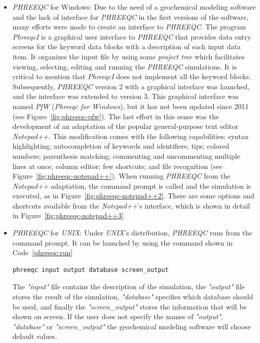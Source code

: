 \begin{itemize}
\item \emph{PHREEQC} for Windows: Due to the need of a geochemical modeling software and the lack of interface for \emph{PHREEQC} in the first versions of the software, many efforts were made to create an interface to \emph{PHREEQC}. The program \emph{PhreeqcI} is a graphical user interface to \emph{PHREEQC} that provides data entry screens for the keyword data blocks with a description of each input data item. It organizes the input file by using some \emph{project tree} which facilitates viewing, selecting, editing and running the \emph{PHREEQC} simulations. It is critical to mention that \emph{PhreeqcI} does not implement all the keyword blocks. Subsequently, \emph{PHREEQC} version 2 with a graphical interface was launched, and the interface was extended to version 3. This graphical interface was named \emph{PfW} (\emph{Phreeqc for Windows}), but it has not been updated since 2011 (see Figure~\ref{fig:phreeqc-pfw}). The last effort in this sense was the development of an adaptation of the popular general-purpose text editor \emph{Notepad++}. This modification comes with the following capabilities: syntax highlighting; autocompletion of keywords and identifiers; tips; colored numbers; parenthesis matching; commenting and uncommenting multiple lines at once; column editor; few shortcuts; and file recognition (see Figure~\ref{fig:phreeqc-notepad++}). When running \emph{PHREEQC} from the \emph{Notepad++} adaptation, the command prompt is called and the simulation is executed, as in Figure~\ref{fig:phreeqc-notepad++2}. There are some options and shortcuts available from the \emph{Notepad++}'s interface, which is shown in detail in Figure~\ref{fig:phreeqc-notepad++3}.
\item \emph{PHREEQC} for \emph{UNIX}: Under \emph{UNIX}'s distribution, \emph{PHREEQC} runs from the command prompt. It can be launched by using the command shown in Code~\ref{phreeqc:run}
\begin{lstlisting}[frame=single, caption=Command to run UNIX's \emph{PHREEQC}, label=phreeqc:run]
phreeqc input output database screen_output
\end{lstlisting}
The \emph{"input"} file contains the description of the simulation, the \emph{"output"} file stores the result of the simulation, \emph{"database"} specifies which database should be used, and finally the \emph{"screen\_output"} stores the information that will be shown on screen. If the user does not specify the names of \emph{"output"}, \emph{"database"} or \emph{"screen\_output"} the geochemical modeling software will choose default values.
\end{itemize}

